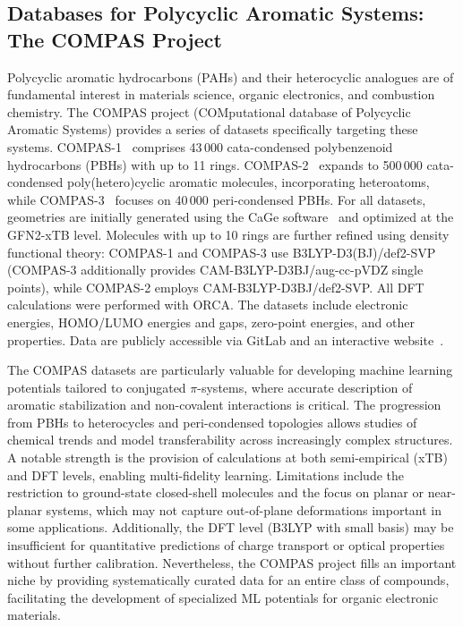 \documentclass[12pt]{article}
\begin{document}
\subsection{Databases for Polycyclic Aromatic Systems: The COMPAS Project}\label{sec:compas}

Polycyclic aromatic hydrocarbons (PAHs) and their heterocyclic analogues are of fundamental interest in materials science, organic electronics, and combustion chemistry. The COMPAS project (COMputational database of Polycyclic Aromatic Systems) provides a series of datasets specifically targeting these systems. COMPAS-1~\cite{ds32-12} comprises 43\,000 cata-condensed polybenzenoid hydrocarbons (PBHs) with up to 11 rings. COMPAS-2~\cite{ds32-13} expands to 500\,000 cata-condensed poly(hetero)cyclic aromatic molecules, incorporating heteroatoms, while COMPAS-3~\cite{ds32-14} focuses on 40\,000 peri-condensed PBHs. For all datasets, geometries are initially generated using the CaGe software~\cite{ds32-160} and optimized at the GFN2-xTB level. Molecules with up to 10 rings are further refined using density functional theory: COMPAS-1 and COMPAS-3 use B3LYP-D3(BJ)/def2-SVP (COMPAS-3 additionally provides CAM-B3LYP-D3BJ/aug-cc-pVDZ single points), while COMPAS-2 employs CAM-B3LYP-D3BJ/def2-SVP. All DFT calculations were performed with ORCA. The datasets include electronic energies, HOMO/LUMO energies and gaps, zero-point energies, and other properties. Data are publicly accessible via GitLab and an interactive website~\cite{ds32-161}.

The COMPAS datasets are particularly valuable for developing machine learning potentials tailored to conjugated \(\pi\)-systems, where accurate description of aromatic stabilization and non-covalent interactions is critical. The progression from PBHs to heterocycles and peri-condensed topologies allows studies of chemical trends and model transferability across increasingly complex structures. A notable strength is the provision of calculations at both semi-empirical (xTB) and DFT levels, enabling multi-fidelity learning. Limitations include the restriction to ground-state closed-shell molecules and the focus on planar or near-planar systems, which may not capture out-of-plane deformations important in some applications. Additionally, the DFT level (B3LYP with small basis) may be insufficient for quantitative predictions of charge transport or optical properties without further calibration. Nevertheless, the COMPAS project fills an important niche by providing systematically curated data for an entire class of compounds, facilitating the development of specialized ML potentials for organic electronic materials.
\end{document}
